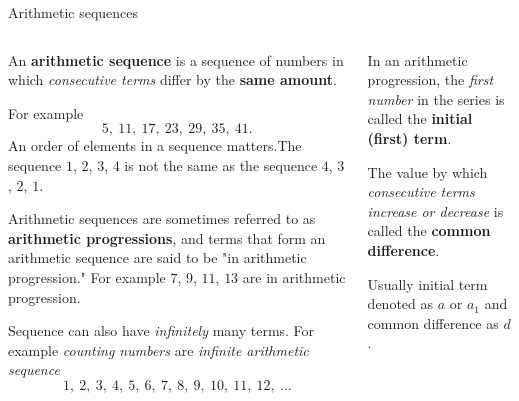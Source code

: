 \documentclass[9pt,aspectratio=169]{beamer}
\begin{document}
\begin{frame}{Arithmetic sequences}
  \begin{columns}[T]
    \begin{column}{0.5\textwidth}
      \begin{definition}
        An \textbf{arithmetic sequence} is a sequence of numbers in which \emph{consecutive terms} differ by the \textbf{same amount}.
      \end{definition}
      For example
      \[ 5,\ 11,\ 17,\ 23,\ 29,\ 35,\ 41. \]
      An order of elements in a sequence matters.The sequence $1$, $2$, $3$, $4$ is not the same as the sequence $4$, $3$, $2$, $1$. 

      Arithmetic sequences are sometimes referred to as \textbf{arithmetic progressions}, and terms that form an arithmetic sequence are said to be "in arithmetic progression." For example $7$, $9$, $11$, $13$ are in arithmetic progression.
      
      Sequence can also have \emph{infinitely} many terms. For example \emph{counting numbers} are \emph{infinite arithmetic sequence}
      \[ 1,\ 2,\ 3,\ 4,\ 5,\ 6,\ 7,\ 8,\ 9,\ 10,\ 11,\ 12,\ \ldots \]
    \end{column}
    \begin{column}{0.5\textwidth}
      \begin{definition}
        In an arithmetic progression, the \emph{first number} in the series is called the \textbf{initial (first) term}.\smallskip

        The value by which \emph{consecutive terms increase or decrease} is called the \textbf{common difference}.
      \end{definition}
      Usually initial term denoted as $a$ or $a_1$ and common difference as $d$.


\end{column}
\end{columns}
\end{frame}
\end{document}

